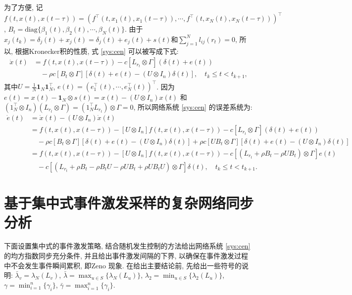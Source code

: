         为了方便, 记$f(t,x(t),x(t-\tau))=(f^\top(t,x_1(t),x_1(t-\tau)),\cdots,f^\top(t,x_N(t),x_N(t-\tau)))^\top$, $B_t=\text{diag}\{\beta_{1}(t),\beta_{2}(t),\cdots,\beta_{N}(t)\}$. 由于$x_j(t_k)=\delta_j(t)+x_j(t)=\delta_j(t)+e_j(t)+s(t)$和$\sum_{j=1}^Nl_{ij}(r_t)=0$, 所以, 根据Kronecker积的性质, 式 \eqref{sys:cen} 可以被写成下式:
        \begin{align}\label{dxt}
        \nonumber \dot{x}(t)&=f(t,x(t),x(t-\tau))-c[L_{r_t}\otimes\Gamma]({\delta}(t)+e(t))\\
       &\quad-\rho c[B_t\otimes\Gamma][{\delta}(t)+e(t)-(U\otimes I_n)\delta(t)],\quad t_k\leq t<t_{k+1},
        \end{align}
        其中$U=\frac{1}{N}\mathbf{1}_N\mathbf{1}^\top_N$, $e(t)=(e^\top_1(t),\cdots,e^\top_N(t))^\top$. 因为$e(t)=x(t)-\mathbf{1}_N\otimes{s}(t)=x(t)-(U\otimes I_n)x(t)$ 和$(1_N^\top\otimes I_n)(L_{r_t}\otimes \Gamma)=(1_N^\top L_{r_t})\otimes \Gamma=0$, 所以网络系统 \eqref{sys:cen} 的误差系统为:
        \begin{align}\label{cee}
        \nonumber \dot{e}(t)&=\dot{x}(t)-(U\otimes I_n)\dot{x}(t)\\
        \nonumber&=f(t,x(t),x(t-\tau))-[U\otimes I_n]f(t,x(t),x(t-\tau))
        -c[L_{r_t}\otimes\Gamma]({\delta}(t)+e(t))\\
        \nonumber&\quad-\rho c[B_t\otimes\Gamma][{\delta}(t)+e(t)-(U\otimes I_n)\delta(t)]
        +\rho c[UB_t\otimes\Gamma][{\delta}(t)+e(t)-(U\otimes I_n)\delta(t)]\\
        \nonumber&=f(t,x(t),x(t-\tau))-[U\otimes I_n]f(t,x(t),x(t-\tau))
        -c[(L_{r_t}+\rho B_t-\rho UB_t)\otimes \Gamma]e(t)\\
        &\quad-c[(L_{r_t}+\rho B_t-\rho B_tU-\rho UB_t+\rho UB_tU)\otimes \Gamma]{\delta}(t),\quad t_k\leq t<t_{k+1}.
        \end{align}
\section{基于集中式事件激发采样的复杂网络同步分析}\label{result}
        下面设置集中式的事件激发策略, 结合随机发生控制的方法给出网络系统 \eqref{sys:cen} 的均方指数同步充分条件, 并且给出事件激发间隔的下界, 以确保在事件激发过程中不会发生事件瞬间累积, 即Zeno 现象. 在给出主要结论前, 先给出一些符号的说明: $\bar{\lambda}_v=\lambda_N(L_v)$, $\bar{\lambda}=\max_{u\in S}\{\lambda_N(L_u)\}$, $\lambda_2=\min_{u\in S}\{\lambda_2(L_u)\}$, $\gamma=\min_{i=1}^n\{\gamma_i\}$, $\bar{\gamma}=\max_{i=1}^n\{\gamma_i\}$.
